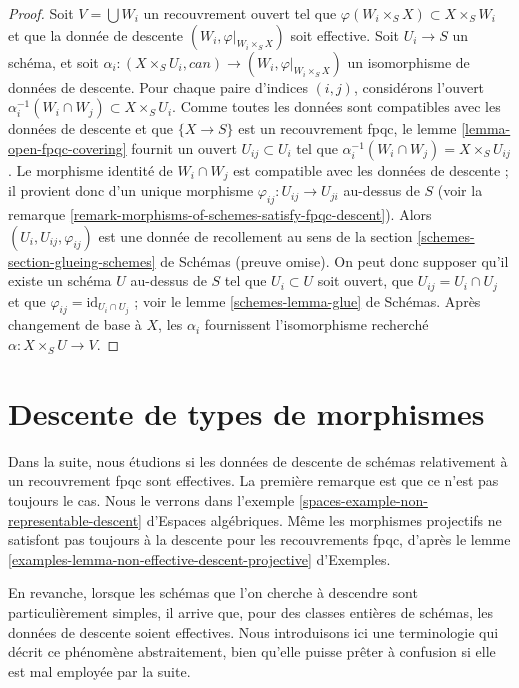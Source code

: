 \begin{proof}
Soit $V = \bigcup W_i$ un recouvrement ouvert tel que
$\varphi(W_i \times_S X) \subset X \times_S W_i$ et que la donnée de descente
$(W_i, \varphi|_{W_i \times_S X})$ soit effective. Soit $U_i \to S$ un
schéma, et soit
$\alpha_i : (X \times_S U_i, can) \to (W_i, \varphi|_{W_i \times_S X})$ un
isomorphisme de données de descente. Pour chaque paire d'indices $(i, j)$,
considérons l'ouvert
$\alpha_i^{-1}(W_i \cap W_j) \subset X \times_S U_i$. Comme toutes les
données sont compatibles avec les données de descente et que
$\{X \to S\}$ est un recouvrement fpqc, le
lemme \ref{lemma-open-fpqc-covering} fournit un ouvert
$U_{ij} \subset U_i$ tel que
$\alpha_i^{-1}(W_i \cap W_j) = X \times_S U_{ij}$. Le morphisme identité de
$W_i \cap W_j$ est compatible avec les données de descente ; il provient donc
d'un unique morphisme $\varphi_{ij} : U_{ij} \to U_{ji}$ au-dessus de $S$
(voir la remarque \ref{remark-morphisms-of-schemes-satisfy-fpqc-descent}).
Alors $(U_i, U_{ij}, \varphi_{ij})$ est une donnée de recollement au sens de
la section \ref{schemes-section-glueing-schemes} de Schémas (preuve omise). On peut
donc supposer qu'il existe un schéma $U$ au-dessus de $S$ tel que
$U_i \subset U$ soit ouvert, que $U_{ij} = U_i \cap U_j$ et que
$\varphi_{ij} = \text{id}_{U_i \cap U_j}$ ; voir le
lemme \ref{schemes-lemma-glue} de Schémas. Après changement de base à $X$, les
$\alpha_i$ fournissent l'isomorphisme recherché
$\alpha : X \times_S U \to V$.
\end{proof}







\section{Descente de types de morphismes}
\label{section-descending-types-morphisms}

\noindent
Dans la suite, nous étudions si les données de descente de schémas
relativement à un recouvrement fpqc sont effectives. La première remarque est
que ce n'est pas toujours le cas. Nous le verrons dans
l'exemple \ref{spaces-example-non-representable-descent} d'Espaces algébriques. Même les morphismes
projectifs ne satisfont pas toujours à la descente pour les recouvrements
fpqc, d'après le
lemme \ref{examples-lemma-non-effective-descent-projective} d'Exemples.

\medskip\noindent
En revanche, lorsque les schémas que l'on cherche à descendre sont
particulièrement simples, il arrive que, pour des classes entières de schémas,
les données de descente soient effectives. Nous introduisons ici une
terminologie qui décrit ce phénomène abstraitement, bien qu'elle puisse prêter
à confusion si elle est mal employée par la suite.

